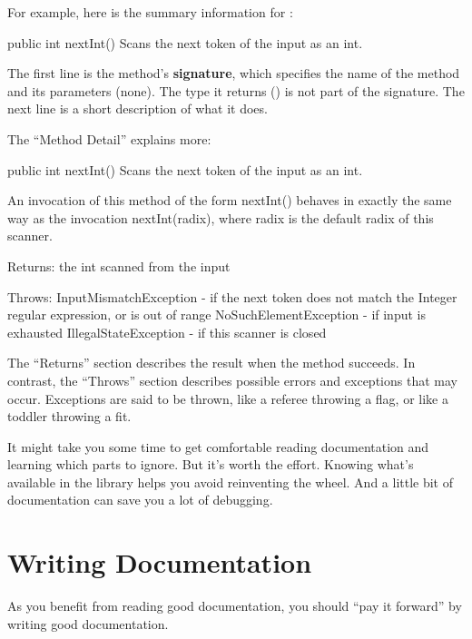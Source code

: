 For example, here is the summary information for :

\begin{stdout}
public int nextInt()
Scans the next token of the input as an int.
\end{stdout}


The first line is the method's {\bf signature}, which specifies the name of the method and its parameters (none). The type it returns () is not part of the signature.
The next line is a short description of what it does.

The ``Method Detail'' explains more:

\begin{stdout}
public int nextInt()
Scans the next token of the input as an int.

An invocation of this method of the form nextInt() behaves in
exactly the same way as the invocation nextInt(radix), where
radix is the default radix of this scanner.

Returns:
the int scanned from the input

Throws:
InputMismatchException - if the next token does not match
    the Integer regular expression, or is out of range
NoSuchElementException - if input is exhausted
IllegalStateException - if this scanner is closed
\end{stdout}

The ``Returns'' section describes the result when the method succeeds.
In contrast, the ``Throws'' section describes possible errors and exceptions that may occur.
Exceptions are said to be thrown, like a referee throwing a flag, or like a toddler throwing a fit.

It might take you some time to get comfortable reading documentation and learning which parts to ignore.
But it's worth the effort.
Knowing what's available in the library helps you avoid reinventing the wheel.
And a little bit of documentation can save you a lot of debugging.


\section{Writing Documentation}
\label{javadoc_writing-documentation}

As you benefit from reading good documentation, you should ``pay it forward'' by writing good documentation.


